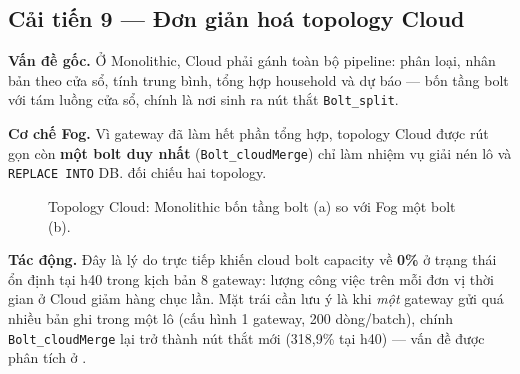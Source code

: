 \documentclass[13pt,a4paper]{report}
\newcommand{\code}[1]{\texttt{\small #1}}
\begin{document}
\subsection{Cải tiến 9 --- Đơn giản hoá topology Cloud}

\textbf{Vấn đề gốc.} Ở Monolithic, Cloud phải gánh toàn bộ pipeline: phân loại,
nhân bản theo cửa sổ, tính trung bình, tổng hợp household và dự báo --- bốn tầng
bolt với tám luồng cửa sổ, chính là nơi sinh ra nút thắt \code{Bolt\_split}.

\textbf{Cơ chế Fog.} Vì gateway đã làm hết phần tổng hợp, topology Cloud được rút
gọn còn \textbf{một bolt duy nhất} (\code{Bolt\_cloudMerge}) chỉ làm nhiệm vụ giải
nén lô và \code{REPLACE INTO} DB.  đối chiếu hai topology.

\begin{figure}[H]
\centering
{}
\caption{Topology Cloud: Monolithic bốn tầng bolt (a) so với Fog một bolt (b).}
\label{fig:imp-cloudtopo}
\end{figure}

\textbf{Tác động.} Đây là lý do trực tiếp khiến cloud bolt capacity về \textbf{0\%}
ở trạng thái ổn định tại h40 trong kịch bản 8 gateway: lượng công việc trên mỗi
đơn vị thời gian ở Cloud giảm hàng chục lần. Mặt trái cần lưu ý là khi \textit{một}
gateway gửi quá nhiều bản ghi trong một lô (cấu hình 1 gateway, 200 dòng/batch),
chính \code{Bolt\_cloudMerge} lại trở thành nút thắt mới (318,9\% tại h40) --- vấn
đề được phân tích ở .
\end{document}
